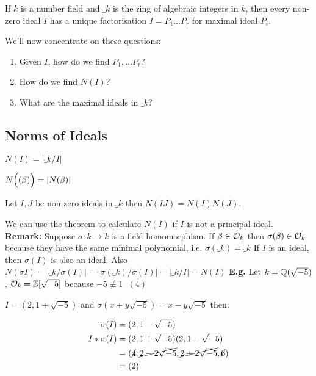 \documentclass[11pt]{article}
\begin{document}
\begin{theorem}
If $k$ is a number field and $\ring_k$ is the ring of algebraic integers in $k$, then every non-zero ideal $I$ has a unique factorisation $I = P_1 \dots P_r$ for maximal ideal $P_i$.
\end{theorem}
\spa
We'll now concentrate on these questions:
\begin{enumerate}
	\item{Given $I$, how do we find $P_1, \dots P_r$?}
	\item{How do we find $N(I)$?}
	\item{What are the maximal ideals in $\ring_k$?}
\end{enumerate}

\subsection{Norms of Ideals}

\begin{defn}
	$N(I) = |\ring_k/I|$

	$N\Big( (\beta)\Big) = |N(\beta)|$
\end{defn}

\begin{theorem}
	Let $I, J$ be non-zero ideals in $\ring_k$ then $N(IJ) = N(I)N(J)$.
\end{theorem}
\spa
We can use the theorem to calculate $N(I)$ if $I$ is not a principal ideal.
\spac
\textbf{Remark:} Suppose $\sigma: k \rightarrow k$ is a field homomorphism.
\spac
If $\beta \in \mathcal{O}_k$ then $\sigma(\beta) \in \mathcal{O}_k$ because they have the same minimal polynomial, i.e. $\sigma(\ring_k) = \ring_k$
\spac
If $I$ is an ideal, then $\sigma(I)$ is also an ideal.
\spac 
Also $N(\sigma I) = |\ring_k /\sigma(I) | = |\sigma(\ring_k) /\sigma(I)| = |\ring_k / I| = N(I)$ 
\spac
\textbf{E.g.} Let $k = \mathbb{Q}(\sqrt{-5})$, $\mathcal{O}_k = \mathbb{Z}[\sqrt{-5}]$ because $-5 \not \equiv 1 \hspace{7pt} (4) $
\spa

$I = (2, 1+\sqrt{-5})$ and $\sigma(x+y\sqrt{-5}) = x-y\sqrt{-5}$ then:

\begin{align*}
	\sigma(I) &= (2, 1-\sqrt{-5})\\
	I* \sigma(I) &= (2, 1+\sqrt{-5} ) (2, 1-\sqrt{-5}) \\
	& = (\cancel{4},\cancel{2 - 2\sqrt{-5}} , \cancel{2+2\sqrt{-5}}, \cancel{6} )\\
	& = (2)
\end{align*}
\end{document}
